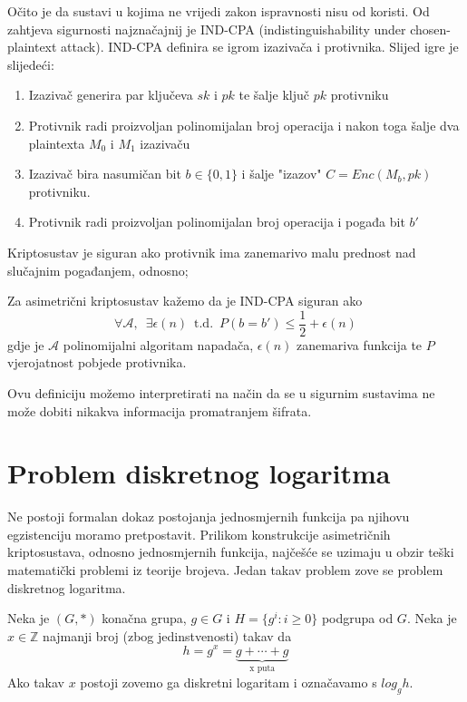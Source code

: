 \documentclass{mathos}
\begin{document}
Očito je da sustavi u kojima ne vrijedi zakon ispravnosti nisu od koristi. Od zahtjeva sigurnosti najznačajnij je IND-CPA (indistinguishability under chosen-plaintext attack). IND-CPA definira se igrom izazivača i protivnika.
Slijed igre je slijedeći:
\begin{enumerate}
    \item Izazivač generira par ključeva $sk$ i $pk$ te šalje ključ $pk$ protivniku
    \item Protivnik radi proizvoljan polinomijalan broj operacija i nakon toga šalje dva plaintexta $M_0$ i $M_1$ izazivaču
    \item Izazivač bira nasumičan bit $b\in\{0, 1\}$ i šalje "izazov" $C = Enc(M_b, pk)$ protivniku.
    \item Protivnik radi proizvoljan polinomijalan broj operacija i pogađa bit $b'$ 
\end{enumerate}
Kriptosustav je siguran ako protivnik ima zanemarivo malu prednost nad slučajnim pogađanjem, odnosno;

\begin{defin}
    Za asimetrični kriptosustav kažemo da je IND-CPA siguran ako
    \[\forall \mathcal{A}, \enspace \exists \epsilon(n) \enspace \text{t.d.} \enspace P(b = b') \leq \frac{1}{2} + \epsilon(n) \]
    gdje je $\mathcal{A}$ polinomijalni algoritam napadača, $\epsilon(n)$ zanemariva funkcija te $P$ vjerojatnost pobjede protivnika.
\end{defin}

\begin{nap}
    Ovu definiciju možemo interpretirati na način da se u sigurnim sustavima ne može dobiti nikakva informacija promatranjem šifrata.
\end{nap}

\section{Problem diskretnog logaritma}
Ne postoji formalan dokaz postojanja jednosmjernih funkcija pa njihovu egzistenciju moramo pretpostavit. Prilikom konstrukcije asimetričnih kriptosustava, odnosno jednosmjernih funkcija, najčešće se uzimaju u obzir teški matematički problemi iz teorije brojeva. Jedan takav problem zove se problem diskretnog logaritma.

\begin{defin}
    \label{DLP}
    Neka je $(G, *)$ konačna grupa, $g\in G$ i $H = \{g^i: i \geq 0\}$ podgrupa od $G$. Neka je $x \in \mathbb{Z}$ najmanji broj (zbog jedinstvenosti) takav da
    \[ h = g^x = \underbrace{g + \cdots + g}_{\text{x puta}} \]
    Ako takav $x$ postoji zovemo ga diskretni logaritam i označavamo s $log_g h$.
\end{defin}
\end{document}
